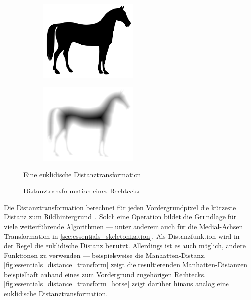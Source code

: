 \begin{figure}[ht]
    \centering
    \begin{subfigure}[t]{0.45\textwidth}
        \centering
        \includegraphics[interpolate=false,height=4cm]{images/holsteiner-stute}
    \end{subfigure}
    \hfill
    \begin{subfigure}[t]{0.45\textwidth}
        \centering
        \includegraphics[interpolate=false,height=4cm]{images/essentials_distance_transform_horse}
    \end{subfigure}
    \caption{Eine euklidische Distanztransformation~\cite{DBLP:journals/pami/MaurerQR03,scikit-image}}%
    \label{fig:essentials_distance_transform_horse}
\end{figure}

\wrapfigurefix{0bp}
\begin{figure}
    \centering
    
    \caption{Distanztransformation eines Rechtecks}%
    \label{fig:essentials_distance_transform}
\end{figure}
Die Distanztransformation berechnet für jeden Vordergrundpixel die kürzeste Distanz zum Bildhintergrund~\cite{DBLP:journals/pr/RosenfeldP68}.
Solch eine Operation bildet die Grundlage für viele weiterführende Algorithmen --- unter anderem auch für die Medial-Achsen Transformation in \autoref{sec:essentials_skeletonization}.
Als Distanzfunktion wird in der Regel die euklidische Distanz benutzt.
Allerdings ist es auch möglich, andere Funktionen zu verwenden --- beispielsweise die Manhatten-Distanz.
\autoref{fig:essentials_distance_transform} zeigt die resultierenden Manhatten-Distanzen beispielhaft anhand eines zum Vordergrund zugehörigen Rechtecks.
\autoref{fig:essentials_distance_transform_horse} zeigt darüber hinaus analog eine euklidische Distanztransformation.
\wrapfigureunfix{}

